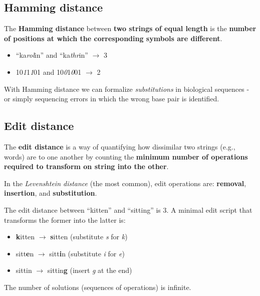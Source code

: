 \documentclass[12pt, letterpaper]{article}
\begin{document}
\subsection{Hamming distance}

The \textbf{Hamming distance} between \textbf{two strings of equal length} is the \textbf{number of positions at which the corresponding symbols are different}.

\begin{itemize}
\item ``ka\emph{rol}in'' and ``ka\emph{thr}in'' $\rightarrow$ 3
\item 10\emph{1}1\emph{1}01 and 10\emph{0}1\emph{0}01 $\rightarrow$ 2
\end{itemize}

With Hamming distance we can formalize \emph{substitutions} in biological sequences - or simply sequencing errors in which the wrong base pair is identified.

\subsection{Edit distance}

The \textbf{edit distance} is a way of quantifying how dissimilar two strings (e.g., words) are to one another by counting the \textbf{minimum number of operations required to transform on string into the other}.

In the \emph{Levenshtein distance} (the most common), edit operations are: \textbf{removal}, \textbf{insertion}, and \textbf{substitution}.

The edit distance between ``kitten'' and ``sitting'' is 3. A minimal edit script that transforms the former into the latter is:

\begin{itemize}
\item \textbf{k}itten $\rightarrow$ \textbf{s}itten (substitute \emph{s} for \emph{k})
\item sitt\textbf{e}n $\rightarrow$ sitt\textbf{i}n (substitute \emph{i} for \emph{e})
\item sittin $\rightarrow$ sittin\textbf{g} (insert \emph{g} at the end)
\end{itemize}

The number of solutions (sequences of operations) is infinite.
\end{document}
